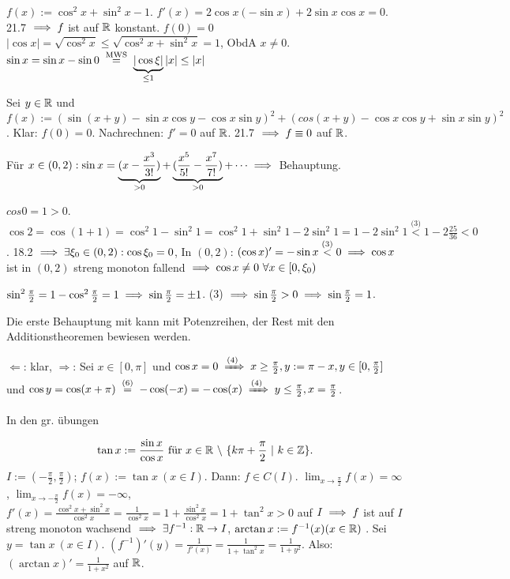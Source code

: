 \documentclass[a4paper,oneside,DIV15,BCOR12mm]{scrbook}
\begin{document}
\begin{beweise}
\item $f(x):=\cos^2 x + \sin^2 x -1$. $f'(x)=2\cos x(-\sin x)+2\sin x\cos x=0$. 21.7 $\implies f$ ist auf $\mathbb{R}$ konstant. $f(0)=0$ $|\cos x|=\sqrt{\cos^2 x} \le \sqrt{\cos^2 x + \sin^2 x}=1$, ObdA $x\ne0$. $\sin x=\sin x-\sin 0 \gleichnach{MWS} \underbrace{|\cos \xi|}_{\le 1}|x| \le |x|$
\item Sei $y \in \mathbb{R}$ und $f(x):=(\sin(x+y)-\sin x \cos y - \cos x \sin y)^2 + (cos(x+y)-\cos x \cos y + \sin x \sin y)^2$. Klar: $f(0)=0$. Nachrechnen: $f'=0$ auf $\mathbb{R}$. 21.7 $\implies f\equiv 0$ auf $\mathbb{R}$.
\item Für $x\in(0,2): \sin x = \underbrace{(x-\frac{x^3}{3!})}_{>0}+\underbrace{(\frac{x^5}{5!}-\frac{x^7}{7!})}_{>0}+\cdots \implies$ Behauptung.
\item $cos 0 = 1> 0$. $\cos 2 = \cos(1+1) = \cos^2 1 - \sin^2 1=\cos^2 1 + \sin^2 1 - 2\sin^2 1 = 1-2\sin^2 1 \overset{\text{(3)}}{<} 1-2\frac{25}{36}<0$. 18.2 $\implies \exists \xi_0 \in (0, 2): \cos \xi_0=0$, In $(0,2)$: $(\cos x)'=-\sin x \overset{\text{(3)}}{<} 0 \implies \cos x$ ist in $(0,2)$ streng monoton fallend $\folgt \cos x \ne 0 \ \forall x \in [0, \xi_0)$
\item $\sin^2\frac{\pi}{2}=1-\cos^2\frac{\pi}{2}=1\implies\sin\frac{\pi}{2}=\pm 1$. (3) $\implies\sin\frac{\pi}{2}>0\implies\sin\frac{\pi}{2}=1$.
\item Die erste Behauptung mit kann mit Potenzreihen, der Rest mit den Additionstheoremen bewiesen werden.
\item \glqq$\Leftarrow$\grqq: klar, \glqq$\Rightarrow$\grqq: Sei $x\in[0, \pi]$ und $\cos x = 0 \folgtnach{(4)} x\ge\frac{\pi}{2}, y:=\pi-x, y \in [0, \frac{\pi}{2}]$ und $\cos y=\cos(x+\pi)\gleichnach{(6)}-\cos(-x)=-\cos(x)\folgtnach{(4)}y\le\frac{\pi}{2}, x=\frac{\pi}{2}$.
\item In den gr. übungen
\end{beweise}

\begin{wichtigedefinition}[Tangens]
$$\tan x:=\frac{\sin x}{\cos x}\ \text{für}\ x \in \MdR\ \backslash\ \{k\pi+\frac{\pi}{2}\ |\ k \in \MdZ\}.$$ $I:=(-\frac{\pi}{2}, \frac{\pi}{2})$; $f(x):=\tan x\ (x\in I)$. Dann: $f\in C(I)$. $
\displaystyle\lim_{x\to\frac{\pi}{2}}{f(x)}=\infty$, $\displaystyle\lim_{x\to-\frac{\pi}{2}}{f(x)}=-\infty$, $f'(x)=\frac{\cos^2 x + \sin^2 x}{\cos^2 x}=\frac{1}{\cos^2 x}=1+\frac{\sin^2 x}{\cos^2 x}=1+\tan^2 x>0$ auf $I \implies f$ ist auf $I$ streng monoton wachsend $\implies \exists f^{-1}: \mathbb{R} \to I$, $\arctan x:=f^{-1}(x) (x \in \mathbb{R})$ . Sei $y=\tan x\ (x \in I)$. $(f^{-1})'(y)=\frac{1}{f'(x)}=\frac{1}{1+\tan^2 x}=\frac{1}{1+y^2}$. Also: $(\arctan x)'=\frac{1}{1+x^2}$ auf $\mathbb{R}$.
\end{wichtigedefinition}
\end{document}
